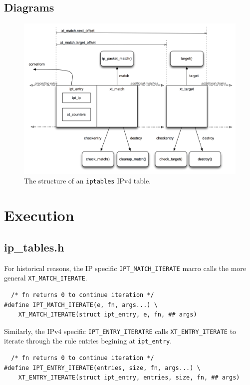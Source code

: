 \documentclass[a4paper,10pt]{article}
\newcommand{\code}[1]{\texttt{{#1}}}
\begin{document}
\subsection{Diagrams}

\begin{figure}[H]
\centering
\includegraphics[totalheight=0.40\textheight]{images/table1.png}
\caption{The structure of an \code{iptables} IPv4 table.}\label{fig:table1}
\end{figure}

\section{Execution}

\subsection{ip\_tables.h}

For historical reasons, the IP specific \code{IPT\_MATCH\_ITERATE}
macro calls the more general \code{XT\_MATCH\_ITERATE}. 

\begin{lstlisting}
  /* fn returns 0 to continue iteration */
#define IPT_MATCH_ITERATE(e, fn, args...) \
	XT_MATCH_ITERATE(struct ipt_entry, e, fn, ## args)
\end{lstlisting}

Similarly, the IPv4 specific \code{IPT\_ENTRY\_ITERATRE} calls
\code{XT\_ENTRY\_ITERATE} to iterate through the rule entries begining
at \code{ipt\_entry}.

\begin{lstlisting}
  /* fn returns 0 to continue iteration */
#define IPT_ENTRY_ITERATE(entries, size, fn, args...) \
	XT_ENTRY_ITERATE(struct ipt_entry, entries, size, fn, ## args)
\end{lstlisting}
\end{document}
